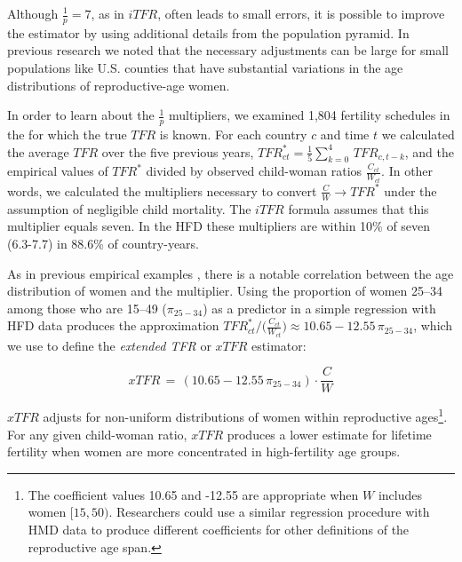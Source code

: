 \documentclass[12pt]{article}
\begin{document}
Although \(\tfrac{1}{p}=7\), as in \(iTFR\), often leads to small
errors, it is possible to improve the estimator by using additional
details from the population pyramid. In previous research
\citep{schmertmann2019bayesian} we noted that the necessary adjustments
can be large for small populations like U.S. counties that have
substantial variations in the age distributions of reproductive-age
women.

In order to learn about the \(\tfrac{1}{p}\) multipliers, we examined
1,804 fertility schedules in the \citet[HFD,~][]{HFD} for which the true
\(TFR\) is known. For each country \(c\) and time \(t\) we calculated
the average \(TFR\) over the five previous years,
\(TFR^\ast_{ct} = \tfrac{1}{5}\sum_{k=0}^4\,TFR_{c,t-k}\), and the
empirical values of \(TFR^\ast\) divided by observed child-woman ratios
\(\tfrac{C_{ct}}{W_{ct}}\). In other words, we calculated the
multipliers necessary to convert \(\tfrac{C}{W}\rightarrow TFR^\ast\)
under the assumption of negligible child mortality. The \(iTFR\) formula
assumes that this multiplier equals seven. In the HFD these multipliers
are within 10\% of seven (6.3-7.7) in 88.6\% of country-years.

As in previous empirical examples \citep{schmertmann2019bayesian}, there
is a notable correlation between the age distribution of women and the
multiplier. Using the proportion of women 25--34 among those who are
15--49 (\(\pi_{25-34}\)) as a predictor in a simple regression with HFD
data produces the approximation
\(TFR^\ast_{ct}/({\tfrac{C_{ct}}{W_{ct}} ) } \approx 10.65 -12.55 \,\pi_{25-34}\),
which we use to define the \emph{extended TFR} or \(xTFR\) estimator:

\begin{equation}
  xTFR \, = \, \left( 10.65 -12.55\, \pi_{25-34}\right) \cdot \frac{C}{W} \label{eq:xTFR}
\end{equation}

\(xTFR\) adjusts for non-uniform distributions of women within
reproductive
ages\footnote{The coefficient values 10.65 and -12.55 are appropriate when $W$ includes women $[15,50)$. Researchers could use a similar regression procedure with HMD data to produce different coefficients for other definitions of the reproductive age span.}.
For any given child-woman ratio, \(xTFR\) produces a lower estimate for
lifetime fertility when women are more concentrated in high-fertility
age groups.
\end{document}
